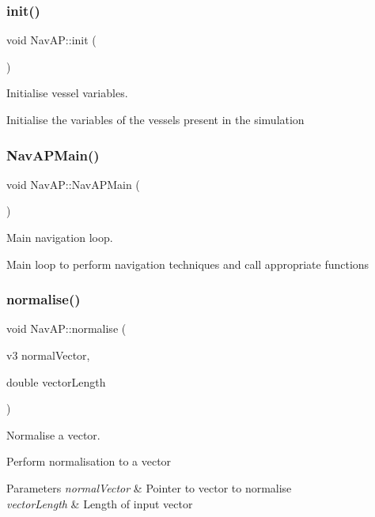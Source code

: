 \subsubsection{\texorpdfstring{init()}{init()}}
{\footnotesize\ttfamily void Nav\+A\+P\+::init (\begin{DoxyParamCaption}{ }\end{DoxyParamCaption})}



Initialise vessel variables. 

Initialise the variables of the vessels present in the simulation \mbox{\label{classNavAP_a8cb9617266b590abfc1bcbfc91281b80}} 
\subsubsection{\texorpdfstring{Nav\+A\+P\+Main()}{NavAPMain()}}
{\footnotesize\ttfamily void Nav\+A\+P\+::\+Nav\+A\+P\+Main (\begin{DoxyParamCaption}{ }\end{DoxyParamCaption})}



Main navigation loop. 

Main loop to perform navigation techniques and call appropriate functions \mbox{\label{classNavAP_ab88867c5e101748bd881f9bd48b03f38}} 
\subsubsection{\texorpdfstring{normalise()}{normalise()}}
{\footnotesize\ttfamily void Nav\+A\+P\+::normalise (\begin{DoxyParamCaption}\item[{v3}]{normal\+Vector,  }\item[{double}]{vector\+Length }\end{DoxyParamCaption})\hspace{0.3cm}{\ttfamily [private]}}



Normalise a vector. 

Perform normalisation to a vector 
\begin{DoxyParams}{Parameters}
{\em normal\+Vector} & Pointer to vector to normalise \\
\hline
{\em vector\+Length} & Length of input vector \\
\hline
\end{DoxyParams}
\mbox{\label{classNavAP_a95201f5107ae00ef860127d54db689f1}} 
